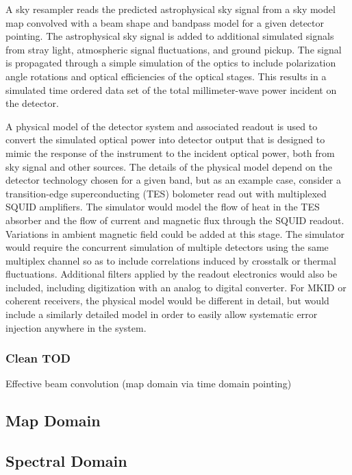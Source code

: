A sky resampler reads the predicted astrophysical sky signal from a sky model map convolved with a beam shape and bandpass model for a given detector pointing.  The astrophysical sky signal is added to additional simulated signals from stray light, atmospheric signal fluctuations, and ground pickup.  The signal is propagated through a simple simulation of the optics to include polarization angle rotations and optical efficiencies of the optical stages. This results in a simulated  time ordered data set of the total millimeter-wave power incident on the detector.

A physical model of the detector system and associated readout is used to convert the simulated optical power into detector output that is designed to mimic  the response of the instrument to the incident optical power, both from sky signal and other sources. The details of the physical model depend on the detector technology chosen for a given band, but as an example case, consider a transition-edge superconducting (TES) bolometer read out with multiplexed SQUID amplifiers.  The simulator would model the flow of heat in the TES absorber and the flow of current and magnetic flux through the SQUID readout.  Variations in ambient magnetic field could be added at this stage.  The simulator would require the concurrent simulation of multiple detectors using the same multiplex channel so as to include correlations induced by crosstalk or thermal fluctuations.  Additional filters applied by the readout electronics would also be included, including digitization with an analog to digital converter. For MKID or coherent receivers, the physical model would be different in detail, but would include a similarly detailed model in order to easily allow systematic error injection anywhere in the system.

\subsubsection{Clean TOD}

Effective beam convolution (map domain via time domain pointing)


\subsection{Map Domain}

\subsection{Spectral Domain}

%



